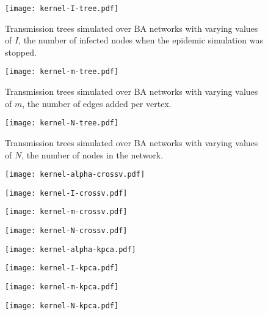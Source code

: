 \begin{figure}
  \centering
  \texttt{[image: kernel-I-tree.pdf]}
  \caption{
    Transmission trees simulated over \gls{BA} networks with varying values of
    $I$, the number of infected nodes when the epidemic simulation was stopped.
  }
  \label{fig:Itrees}
\end{figure}

\begin{figure}
  \centering
  \texttt{[image: kernel-m-tree.pdf]}
  \caption{
    Transmission trees simulated over \gls{BA} networks with varying values of
    $m$, the number of edges added per vertex.
  }
  \label{fig:mtrees}
\end{figure}

\begin{figure}
  \centering
  \texttt{[image: kernel-N-tree.pdf]}
  \caption{
    Transmission trees simulated over \gls{BA} networks with varying values of
    $N$, the number of nodes in the network.
  }
  \label{fig:Ntrees}
\end{figure}

\begin{figure}
  \centering
  \texttt{[image: kernel-alpha-crossv.pdf]}
  \label{fig:alphacrossv}
\end{figure}

\begin{figure}
  \centering
  \texttt{[image: kernel-I-crossv.pdf]}
  \label{fig:Icrossv}
\end{figure}

\begin{figure}
  \centering
  \texttt{[image: kernel-m-crossv.pdf]}
  \label{fig:mcrossv}
\end{figure}

\begin{figure}
  \centering
  \texttt{[image: kernel-N-crossv.pdf]}
  \label{fig:Ncrossv}
\end{figure}

\begin{figure}
  \centering
  \texttt{[image: kernel-alpha-kpca.pdf]}
  \label{fig:alphakpca}
\end{figure}

\begin{figure}
  \centering
  \texttt{[image: kernel-I-kpca.pdf]}
  \label{fig:Ikpca}
\end{figure}

\begin{figure}
  \centering
  \texttt{[image: kernel-m-kpca.pdf]}
  \label{fig:mkpca}
\end{figure}

\begin{figure}
  \centering
  \texttt{[image: kernel-N-kpca.pdf]}
  \label{fig:Nkpca}
\end{figure}
